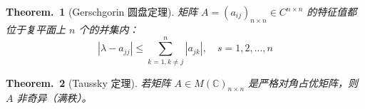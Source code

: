 \documentclass[zihao=5,UTF8]{report}
\def\C{\mathbb{C}}
\theoremstyle{MyTheoremStyle} %
\newtheorem{theorem}{Theorem.\,}
\theoremstyle{MySubsubsectionStyle} %
\begin{document}
\begin{theorem}[Gerschgorin 圆盘定理]\label{Gerschgorin 圆盘定理}
    矩阵 $A = (a_{ij})_{n \times n}\in C^{n\times n} $ 的特征值都位于复平面上 $n$ 个的并集内：
    \begin{equation*}
        |\lambda-a_{jj}|\leqslant\sum_{k=1,k\neq j}^n|a_{jk}|,\quad s=1,2,...,n
    \end{equation*}

\end{theorem}


\begin{theorem}[Taussky 定理]\label{Taussky 定理}
若矩阵 $A \in M(\C)_{n\times n}$ 是严格对角占优矩阵，则 $A$ 非奇异（满秩）。
\end{theorem}
\end{document}
